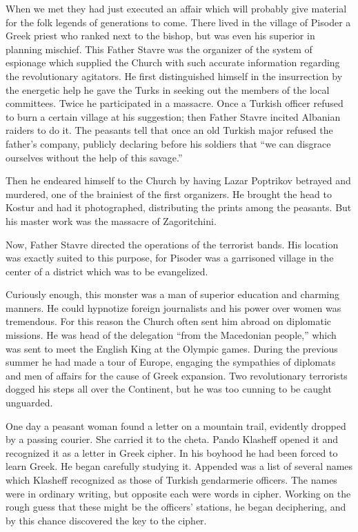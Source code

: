 \documentclass[a5paper,12pt]{book}
\begin{document}
When we met they had just executed an affair which will probably give material for the folk legends of generations to come. There lived in the village of Pisoder a Greek priest who ranked next to the bishop, but was even his superior in planning mischief. This Father Stavre was the organizer of the system of espionage which supplied the Church with such accurate information regarding the revolutionary agitators. He first distinguished himself in the insurrection by the energetic help he gave the Turks in seeking out the members of the local committees. Twice he participated in a massacre. Once a Turkish officer refused to burn a certain village at his suggestion; then Father Stavre incited Albanian raiders to do it. The peasants tell that once an old Turkish major refused the father’s company, publicly declaring before his soldiers that “we can disgrace ourselves without the help of this savage.”

Then he endeared himself to the Church by having Lazar Poptrikov betrayed and murdered, one of the brainiest of the first organizers. He brought the head to Kostur and had it photographed, distributing the prints among the peasants. But his master work was the massacre of Zagoritchini.

Now, Father Stavre directed the operations of the terrorist bands. His location was exactly suited to this purpose, for Pisoder was a garrisoned village in the center of a district which was to be evangelized. 

Curiously enough, this monster was a man of superior education and charming manners. He could hypnotize foreign journalists and his power over women was tremendous. For this reason the Church often sent him abroad on diplomatic missions. He was head of the delegation “from the Macedonian people,” which was sent to meet the English King at the Olympic games. During the previous summer he had made a tour of Europe, engaging the sympathies of diplomats and men of affairs for the cause of Greek expansion. Two revolutionary terrorists dogged his steps all over the Continent, but he was too cunning to be caught unguarded. 

One day a peasant woman found a letter on a mountain trail, evidently dropped by a passing courier. She carried it to the cheta. Pando Klasheff opened it and recognized it as a letter in Greek cipher. In his boyhood he had been forced to learn Greek. He began carefully studying it. Appended was a list of several names which Klasheff recognized as those of Turkish gendarmerie officers. The names were in ordinary writing, but opposite each were words in cipher. Working on the rough guess that these might be the officers' stations, he began deciphering, and by this chance discovered the key to the cipher. 
\end{document}
